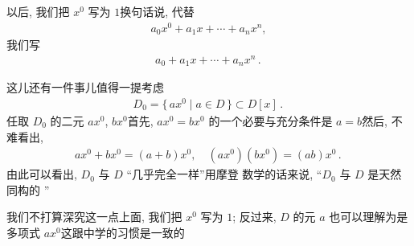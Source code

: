 \begin{remark}
    以后, 我们把 $x^0$ 写为 $1$\period 换句话说, 代替
    \begin{align*}
        a_0 x^0 + a_1 x + \cdots + a_n x^n,
    \end{align*}
    我们写
    \begin{align*}
        a_0 + a_1 x + \cdots + a_n x^n \period
    \end{align*}

    这儿还有一件事儿值得一提\period 考虑
    \begin{align*}
        D_0 = \{\, ax^0 \mid a \in D \,\} \subset D[x] \period
    \end{align*}
    任取 $D_0$ 的二元 $ax^0$, $bx^0$\period 首先, $ax^0 = bx^0$ 的一个必要与充分条件是 $a=b$\period 然后, 不难看出,
    \begin{align*}
        ax^0 + bx^0 = (a+b)x^0, \quad (ax^0)(bx^0) = (ab)x^0 \period
    \end{align*}
    由此可以看出, $D_0$ 与 $D$ ``几乎完全一样''\period 用摩登  数学的话来说, ``$D_0$ 与 $D$ 是天然同构的 ''\period

    我们不打算深究这一点\period 上面, 我们把 $x^0$ 写为 $1$; 反过来, $D$ 的元 $a$ 也可以理解为是多项式 $ax^0$\period 这跟中学的习惯是一致的\period
\end{remark}
